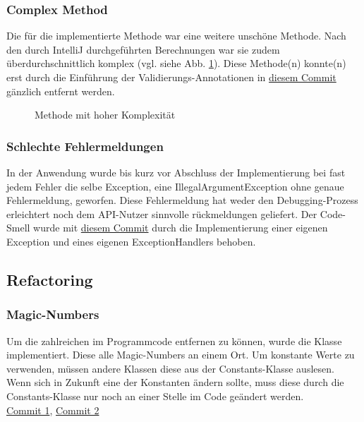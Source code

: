\subsubsection*{Complex Method}
Die für die  implementierte Methode  war eine weitere unschöne Methode. Nach den durch IntelliJ durchgeführten Berechnungen war sie zudem überdurchschnittlich komplex (vgl. siehe Abb. \ref{fig:hc}). Diese Methode(n) konnte(n) erst durch die Einführung der Validierungs-Annotationen in \href{"https://github.com/NI-R0/DH-Software-Engineering-II/commit/1d66a085892b8a36745535f6b7fb183f71d174cd#diff-b90e0d056d7cd0a8a87470a450267e7e4cd1adc99b768975286ad0443fe57ff8"}{diesem Commit} gänzlich entfernt werden.

\begin{figure}[!htb]
    \caption{Methode mit hoher Komplexität}
    \label{fig:hc}
\end{figure}


\subsubsection*{Schlechte Fehlermeldungen}
In der Anwendung wurde bis kurz vor Abschluss der Implementierung bei fast jedem Fehler die selbe Exception, eine IllegalArgumentException ohne genaue Fehlermeldung, geworfen. Diese Fehlermeldung hat weder den Debugging-Prozess erleichtert noch dem API-Nutzer sinnvolle rückmeldungen geliefert. Der Code-Smell wurde mit \href{https://github.com/NI-R0/DH-Software-Engineering-II/commit/44369fb2bfe2282cfb26be4d751847d360065054}{diesem Commit} durch die Implementierung einer eigenen Exception und eines eigenen ExceptionHandlers behoben.


\subsection{Refactoring}
\subsubsection{Magic-Numbers}
Um die zahlreichen  im Programmcode entfernen zu können, wurde die Klasse  implementiert. Diese  alle Magic-Numbers an einem Ort. Um konstante Werte zu verwenden, müssen andere Klassen diese aus der Constants-Klasse auslesen. Wenn sich in Zukunft eine der Konstanten ändern sollte, muss diese durch die Constants-Klasse nur noch an einer Stelle im Code geändert werden.\\
\href{https://github.com/NI-R0/DH-Software-Engineering-II/commit/d79ca697187f4f855cff56c85f8742fa97d70cda#diff-14e3846dce3ed0f79fab55a1ea9cbdc1b8b56ce2a1080f76df4a5e5b3a3328a0}{Commit 1}, \href{https://github.com/NI-R0/DH-Software-Engineering-II/commit/d8304e549c5f34f15c279b92706822649fd49f1c#diff-14e3846dce3ed0f79fab55a1ea9cbdc1b8b56ce2a1080f76df4a5e5b3a3328a0}{Commit 2}

